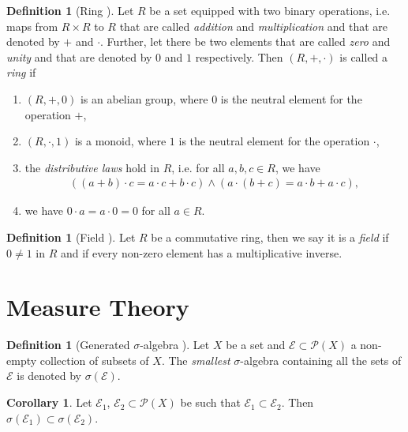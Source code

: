 \documentclass[12pt, a4paper]{article}
\numberwithin{equation}{section}
\theoremstyle{definition}
\theoremstyle{definition}
\newtheorem{defn}[thm]{Definition} %
\newtheorem{corollary}[thm]{Corollary}
\begin{document}
	\begin{defn}[Ring \cite{src:algebra}]\label{defn:ring}
		Let $R$ be a set equipped with two binary operations, i.e. maps from $R\times R$ to $R$ that are called \textit{addition} and \textit{multiplication} and that are denoted by $+$ and $\cdot$. Further, let there be two elements that are called \textit{zero} and \textit{unity} and that are denoted by $0$ and $1$ respectively. Then $(R, +, \cdot)$ is called a \textit{ring} if 
		
		\begin{enumerate}
			\item $(R, +, 0)$ is an abelian group, where $0$ is the neutral element for the operation $+$,
			\item $(R, \cdot, 1)$ is a monoid, where $1$ is the neutral element for the operation $\cdot$,
			\item the \textit{distributive laws} hold in $R$, i.e. for all $a, b, c\in R$, we have
			\begin{align*}
				\left((a + b)\cdot c = a\cdot c + b\cdot c\right) \wedge \left(a\cdot (b + c) = a\cdot b + a\cdot c\right),
			\end{align*}
			\item we have $0\cdot a = a\cdot 0 = 0$ for all $a\in R$.
		\end{enumerate}
	\end{defn}
	
	\begin{defn}[Field \cite{src:algebra}]\label{defn:field}
		Let $R$ be a commutative ring, then we say it is a \textit{field} if $0\neq 1$ in $R$ and if every non-zero element has a multiplicative inverse.
	\end{defn}
	
	\newpage
	
	\section{Measure Theory}
	\begin{defn}[Generated $\sigma$-algebra \cite{generated-sigma-algebras}]
		Let $X$ be a set and $\mathcal E\subset \mathcal P(X)$ a non-empty collection of subsets of $X$. The \textit{smallest} $\sigma$-algebra containing all the sets of $\mathcal E$ is denoted by $\sigma(\mathcal E)$. 
	\end{defn}

	\begin{corollary}
		Let $\mathcal E_1$, $\mathcal E_2\subset \mathcal P(X)$ be such that $\mathcal E_1 \subset \mathcal E_2$. Then $\sigma(\mathcal E_1) \subset \sigma(\mathcal E_2)$.    
	\end{corollary}
	
\end{document}
